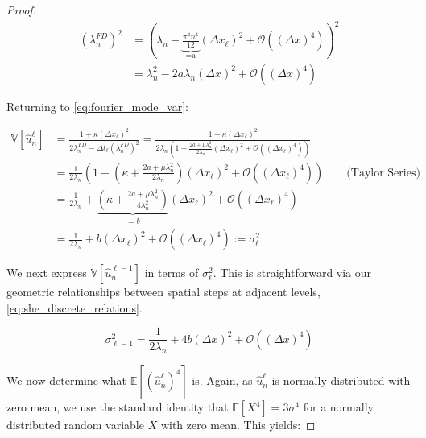 \begin{proof}
    \begin{align*}
        (\lambda_n^{FD})^2 &= (\lambda_n - 
        \underbrace{\frac{\pi^4 n^4}{12}}_{\text{=a}}(\Delta x_\ell)^2
         + \mathcal{O}((\Delta x)^4))^2\\
         &= \lambda_n^2 - 2 a \lambda_n (\Delta x)^2 + 
         \mathcal{O}((\Delta x)^4)
    \end{align*}

    Returning to \eqref{eq:fourier_mode_var}:

    \begin{align*}
        \mathbb{V}[\hat{u}_n^\ell] &= \frac{1 + \kappa(\Delta x_\ell)^2}
        {2 \lambda_n^{FD} - 
        \Delta t_\ell (\lambda_n^{FD})^2} = 
        \frac{1 + \kappa(\Delta x_\ell)^2}
        {2\lambda_n\left(1 - \frac{2a + \mu \lambda_n^2}{2\lambda_n}
        (\Delta x_\ell)^2 + \mathcal{O}\left((\Delta x_\ell)^4\right)\right)} \\
        &= \frac{1}{2 \lambda_n} \left(1 + 
        \left(\kappa + \frac{2a + \mu \lambda_n^2}{2 \lambda_n}\right) (\Delta x_\ell)^2
        + \mathcal{O}\left((\Delta x_\ell)^4\right) \right)
        \qquad \text{(Taylor Series)} \\
        &= \frac{1}{2\lambda_n} + 
        \underbrace{\left(\kappa + \frac{2a + \mu \lambda_n^2}{4\lambda_n^2}\right)}_{=b}(\Delta x_\ell)^2
        + \mathcal{O}\left((\Delta x_\ell)^4\right)
        \\
        &= \frac{1}{2\lambda_n} + 
        b(\Delta x_\ell)^2
        + \mathcal{O}\left((\Delta x_\ell)^4\right) := \sigma_\ell^2
    \end{align*}

    We next express $\mathbb{V}[\hat{u}_n^{\ell-1}]$ in terms of 
    $\sigma_\ell^2$. This is straightforward via our geometric relationships
    between spatial steps at adjacent levels, 
    \eqref{eq:she_discrete_relations}.

    \begin{equation}\label{eq:sigma_ell_1_var}
        \sigma_{\ell-1}^2 = \frac{1}{2\lambda_n} + 4b(\Delta x)^2 + 
        \mathcal{O}\left((\Delta x)^4\right)
    \end{equation}

    We now determine what $\mathbb{E}\left[(\hat{u}_n^\ell)^4\right]$ is.
    Again, as $\hat{u}_n^\ell$ is normally distributed with zero mean, we use
    the standard identity that $\mathbb{E}[X^4] = 3 \sigma^4$ for 
    a normally distributed random variable $X$ with zero mean.
    This yields:


\end{proof}
